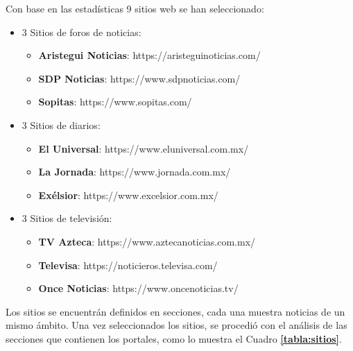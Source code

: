 Con base en las estadísticas 9 sitios web se han seleccionado:

\begin{itemize}
    \item 3 Sitios de foros de noticias: 
    \begin{itemize}
      \item \textbf{Aristegui Noticias}: https://aristeguinoticias.com/
      \item \textbf{SDP Noticias}: https://www.sdpnoticias.com/
      \item \textbf{Sopitas}: https://www.sopitas.com/
    \end{itemize}
    \item 3 Sitios de diarios:
    \begin{itemize}
      \item \textbf{El Universal}: https://www.eluniversal.com.mx/
      \item \textbf{La Jornada}: https://www.jornada.com.mx/
      \item \textbf{Exélsior}: https://www.excelsior.com.mx/
    \end{itemize}
    \item 3 Sitios de televisión:
    \begin{itemize}
      \item \textbf{TV Azteca}: https://www.aztecanoticias.com.mx/
      \item \textbf{Televisa}: https://noticieros.televisa.com/
      \item \textbf{Once Noticias}: https://www.oncenoticias.tv/
    \end{itemize}
\end{itemize}
Los sitios se encuentrán definidos en secciones, cada una muestra noticias de un mismo ámbito. 
Una vez seleccionados los sitios, se procedió con el análisis de las secciones que contienen los portales, como 
lo muestra el Cuadro \textbf{\ref{tabla:sitios}}.
